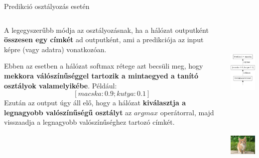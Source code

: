 \documentclass[english, aspectratio=169]{beamer}
\begin{document}
	\begin{frame}{Predikció osztályozás esetén}
		\begin{columns}
			\begin{column}{.7\textwidth}
				A legegyszerűbb módja az osztályozásnak, ha a hálózat outputként \textbf{összesen egy címkét} ad outputként, ami a predikciója az input képre (vagy adatra) vonatkozóan.\par\smallskip
				Ebben az esetben a hálózat softmax rétege azt becsüli meg, hogy \textbf{mekkora válószínűséggel tartozik a mintaegyed a tanító osztályok valamelyikébe}. Például:
				\[
				\left[ macska: 0.9; kutya: 0.1 \right]
				\]
				Ezután az output úgy áll elő, hogy a hálózat \textbf{kiválasztja a legnagyobb valószínűségű osztályt} az $argmax$ operátorral, majd visszaadja a legnagyobb valószínűséghez tartozó címkét.
			\end{column}
			\begin{column}{.3\textwidth}
				\begin{center}
					\includegraphics[height=5cm, keepaspectratio]{graphs/od_1.png}\\
					\vspace{-0.7cm}
					\includegraphics[height=2.5cm, width=2.5cm, keepaspectratio]{images/od_1.png}
				\end{center}
			\end{column}
		\end{columns}
	\end{frame}
	
\end{document}
